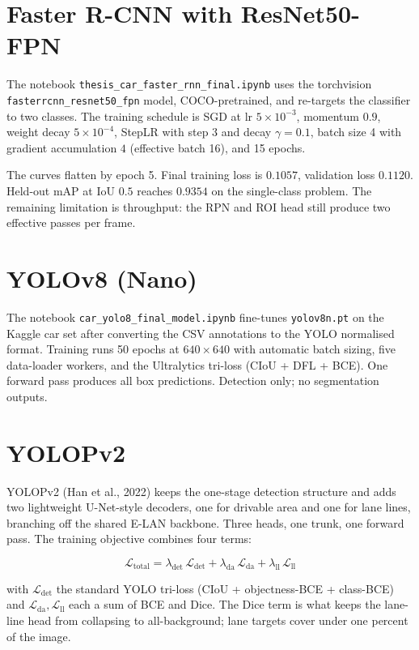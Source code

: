 \documentclass[12pt,a4paper]{report}
\begin{document}
\section{Faster R-CNN with ResNet50-FPN}

The notebook \texttt{thesis\_car\_faster\_rnn\_final.ipynb} uses the torchvision \texttt{fasterrcnn\_resnet50\_fpn} model, COCO-pretrained, and re-targets the classifier to two classes. The training schedule is SGD at lr $5\times10^{-3}$, momentum $0.9$, weight decay $5\times10^{-4}$, StepLR with step $3$ and decay $\gamma = 0.1$, batch size 4 with gradient accumulation $4$ (effective batch 16), and 15 epochs.

The curves flatten by epoch 5. Final training loss is $0.1057$, validation loss $0.1120$. Held-out mAP at IoU $0.5$ reaches $\mathbf{0.9354}$ on the single-class problem. The remaining limitation is throughput: the RPN and ROI head still produce two effective passes per frame.

\section{YOLOv8 (Nano)}

The notebook \texttt{car\_yolo8\_final\_model.ipynb} fine-tunes \texttt{yolov8n.pt} on the Kaggle car set after converting the CSV annotations to the YOLO normalised format. Training runs 50 epochs at $640 \times 640$ with automatic batch sizing, five data-loader workers, and the Ultralytics tri-loss (CIoU + DFL + BCE). One forward pass produces all box predictions. Detection only; no segmentation outputs.

\section{YOLOPv2}

YOLOPv2 (Han et al., 2022) keeps the one-stage detection structure and adds two lightweight U-Net-style decoders, one for drivable area and one for lane lines, branching off the shared E-LAN backbone. Three heads, one trunk, one forward pass. The training objective combines four terms:

\begin{equation}
\mathcal{L}_{\text{total}} = \lambda_{\text{det}}\, \mathcal{L}_{\text{det}} + \lambda_{\text{da}}\, \mathcal{L}_{\text{da}} + \lambda_{\text{ll}}\, \mathcal{L}_{\text{ll}}
\end{equation}

with $\mathcal{L}_{\text{det}}$ the standard YOLO tri-loss (CIoU + objectness-BCE + class-BCE) and $\mathcal{L}_{\text{da}}, \mathcal{L}_{\text{ll}}$ each a sum of BCE and Dice. The Dice term is what keeps the lane-line head from collapsing to all-background; lane targets cover under one percent of the image.
\end{document}
